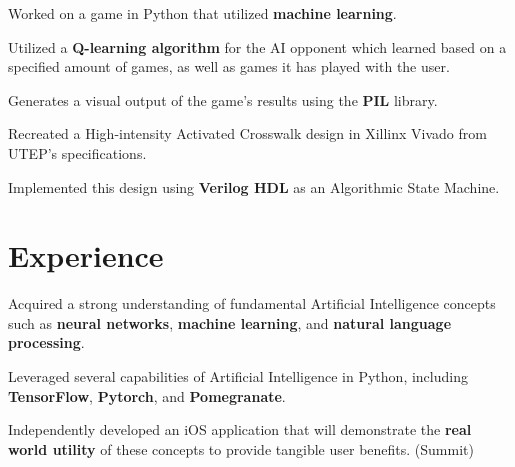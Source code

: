 \documentclass[letterpaper,10pt]{article}
\begin{document}
  \vspace{0pt}
  \begin{resume_list}
    \item Worked on a game in Python that utilized \textbf{machine learning}.
    \vspace{1pt}
    \item Utilized a \textbf{Q-learning algorithm} for the AI opponent which learned based on a specified amount of games, as well as games it has played with the user.
    \vspace{1pt}
    \item Generates a visual output of the game's results using the \textbf{PIL} library.
  \end{resume_list}

  \vspace{0pt}
  \begin{resume_list}
    \item Recreated a High-intensity Activated Crosswalk design in Xillinx Vivado from UTEP's specifications.
    \vspace{1pt}
    \item Implemented this design using \textbf{Verilog HDL} as an Algorithmic State Machine.
  \end{resume_list}

  \vspace{0pt}
  \section{Experience}

  \begin{resume_list}
    \item Acquired a strong understanding of fundamental Artificial Intelligence concepts such as \textbf{neural networks}, \textbf{machine learning}, and \textbf{natural language processing}.
    \vspace{1pt}
    \item Leveraged several capabilities of Artificial Intelligence in Python, including \textbf{TensorFlow}, \textbf{Pytorch}, and \textbf{Pomegranate}.
    \vspace{1pt}
    \item Independently developed an iOS application that will demonstrate the \textbf{real world utility} of these concepts to provide tangible user benefits. (Summit)
    \vspace{2pt}
  \end{resume_list}
\end{document}
